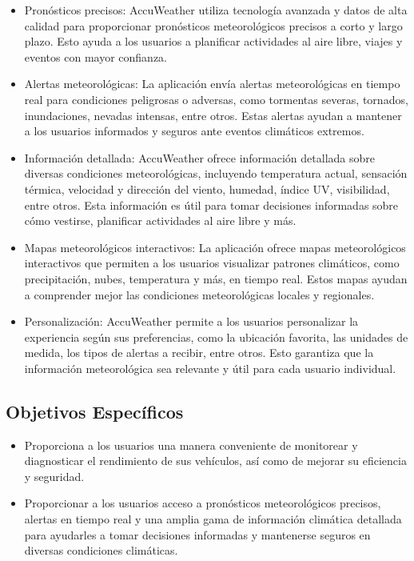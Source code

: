 \documentclass[a4paper,10pt, oneside, titlepage]{article}
\begin{document}
	\begin{itemize}
		\item Pronósticos precisos: AccuWeather utiliza tecnología avanzada y datos de alta calidad para proporcionar pronósticos meteorológicos precisos a corto y largo plazo. Esto ayuda a los usuarios a planificar actividades al aire libre, viajes y eventos con mayor confianza.
		\item Alertas meteorológicas: La aplicación envía alertas meteorológicas en tiempo real para condiciones peligrosas o adversas, como tormentas severas, tornados, inundaciones, nevadas intensas, entre otros. Estas alertas ayudan a mantener a los usuarios informados y seguros ante eventos climáticos extremos.
		\item Información detallada: AccuWeather ofrece información detallada sobre diversas condiciones meteorológicas, incluyendo temperatura actual, sensación térmica, velocidad y dirección del viento, humedad, índice UV, visibilidad, entre otros. Esta información es útil para tomar decisiones informadas sobre cómo vestirse, planificar actividades al aire libre y más.
		\item Mapas meteorológicos interactivos: La aplicación ofrece mapas meteorológicos interactivos que permiten a los usuarios visualizar patrones climáticos, como precipitación, nubes, temperatura y más, en tiempo real. Estos mapas ayudan a comprender mejor las condiciones meteorológicas locales y regionales.
		\item Personalización: AccuWeather permite a los usuarios personalizar la experiencia según sus preferencias, como la ubicación favorita, las unidades de medida, los tipos de alertas a recibir, entre otros. Esto garantiza que la información meteorológica sea relevante y útil para cada usuario individual.
	\end{itemize}
	\subsection{Objetivos Específicos}\label{Etiqueta_Objetivos_Especificos}
	\begin{itemize}
		\item Proporciona a los usuarios una manera conveniente de monitorear y diagnosticar el rendimiento de sus vehículos, así como de mejorar su eficiencia y seguridad.
		\item Proporcionar a los usuarios acceso a pronósticos meteorológicos precisos, alertas en tiempo real y una amplia gama de información climática detallada para ayudarles a tomar decisiones informadas y mantenerse seguros en diversas condiciones climáticas.
	\end{itemize}
	
\end{document}
